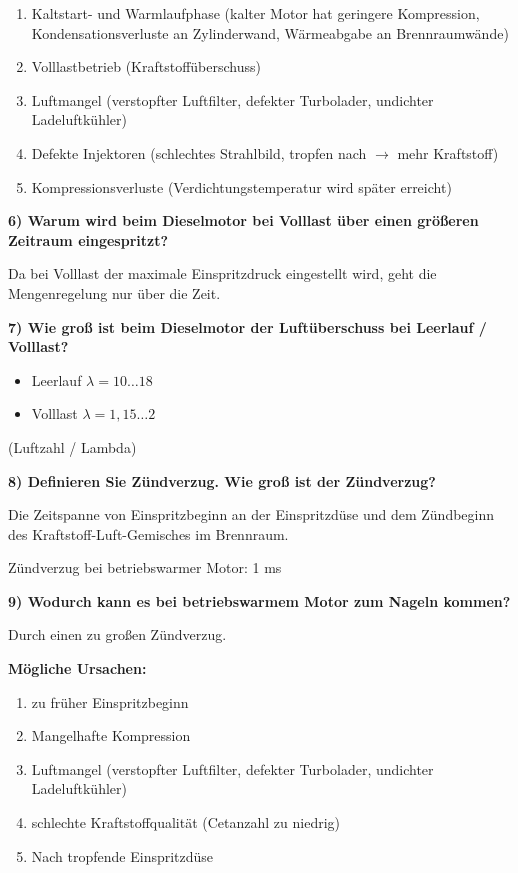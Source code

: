 \begin{enumerate}
\item
  Kaltstart- und Warmlaufphase (kalter Motor hat geringere Kompression,
  Kondensationsverluste an Zylinderwand, Wärmeabgabe an Brennraumwände)
\item
  Volllastbetrieb (Kraftstoffüberschuss)
\item
  Luftmangel (verstopfter Luftfilter, defekter Turbolader, undichter
  Ladeluftkühler)
\item
  Defekte Injektoren (schlechtes Strahlbild, tropfen nach $\to$ mehr
  Kraftstoff)
\item
  Kompressionsverluste (Verdichtungstemperatur wird später erreicht)
\end{enumerate}

\textbf{6) Warum wird beim Dieselmotor bei Volllast über einen größeren
Zeitraum eingespritzt?}

Da bei Volllast der maximale Einspritzdruck eingestellt wird, geht die
Mengenregelung nur über die Zeit.

\textbf{7) Wie groß ist beim Dieselmotor der Luftüberschuss bei Leerlauf
/ Volllast?}

\begin{itemize}
\item
  Leerlauf $\lambda = 10 \dots 18$
\item
  Volllast $\lambda = 1,15 \dots 2$
\end{itemize}

(Luftzahl / Lambda)

\textbf{8) Definieren Sie Zündverzug. Wie groß ist der Zündverzug?}

Die Zeitspanne von Einspritzbeginn an der Einspritzdüse und dem
Zündbeginn des Kraftstoff-Luft-Gemisches im Brennraum.

Zündverzug bei betriebswarmer Motor: 1 ms

\textbf{9) Wodurch kann es bei betriebswarmem Motor zum Nageln kommen?}

Durch einen zu großen Zündverzug.

\textbf{Mögliche Ursachen:}

\begin{enumerate}
\item
  zu früher Einspritzbeginn
\item
  Mangelhafte Kompression
\item
  Luftmangel (verstopfter Luftfilter, defekter Turbolader, undichter
  Ladeluftkühler)
\item
  schlechte Kraftstoffqualität (Cetanzahl zu niedrig)
\item
  Nach tropfende Einspritzdüse
\end{enumerate}

